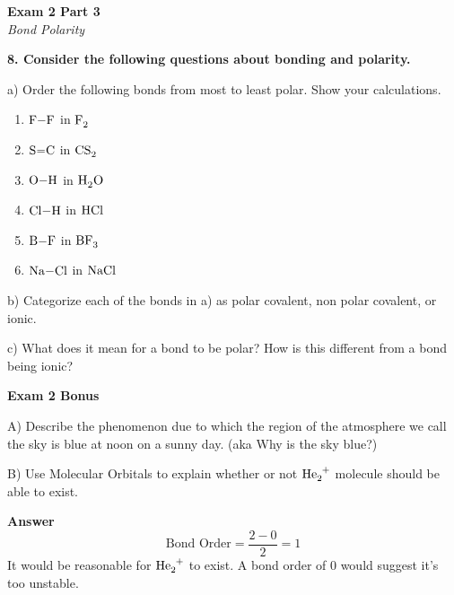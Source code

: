 \documentclass{article}
\begin{document}
    \begin{center}
        \textbf{Exam 2 Part 3}\\
        \textit{Bond Polarity}
    \end{center}
    \textbf{8. Consider the following questions about bonding and polarity.}

    a) Order the following bonds from most to least polar. Show your calculations.
    \begin{enumerate}
        \item $\ce{F-F}$ in $\ce{F2}$
        \item $\ce{S=C}$ in $\ce{CS2}$
        \item $\ce{O-H}$ in $\ce{H2O}$
        \item $\ce{Cl-H}$ in $\ce{HCl}$
        \item $\ce{B-F}$ in $\ce{BF3}$
        \item $\ce{Na-Cl}$ in $\ce{NaCl}$
    \end{enumerate}

    b)  Categorize each of the bonds in a) as polar covalent, non polar covalent, or ionic.

    c) What does it mean for a bond to be polar? How is this different from a bond being ionic?
    \pagebreak

    \begin{center}
        \textbf{Exam 2 Bonus}\\
    \end{center}

    A) Describe the phenomenon due to which the region of the atmosphere we call the sky is blue at noon on a sunny day. (aka Why is the sky blue?)

    B) Use Molecular Orbitals to explain whether or not $\ce{He2+}$ molecule should be able to exist.

    \textbf{Answer}\\
    $$\text{Bond Order} = \dfrac{2 - 0}{2} = 1$$
    It would be reasonable for $\ce{He2+}$ to exist. A bond order of 0 would suggest it's too unstable.

    \pagebreak

\end{document}
